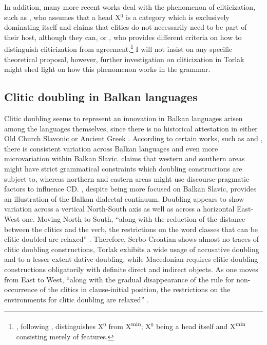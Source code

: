 \documentclass[output=paper,
colorlinks,
citecolor=brown,
newtxmath
]{langscibook}
\begin{document}
In addition, many more recent works deal with the phenomenon of cliticization, such as \citet{Roberts2010}, who assumes that a head X$^0$ is a category which is exclusively dominating itself and claims that clitics do not necessarily need to be part of their host, although they can, or \citet{kramer2014clitic}, who provides different criteria on how to distinguish cliticization from agreement.\footnote{\citet[54]{Roberts2010}, following \citet{Chomsky1995}, distinguishes X$^0$ from X\textsuperscript{min}; X$^0$ being a head itself and X\textsuperscript{min} consisting merely of features.} I will not insist on any specific theoretical proposal, however, further investigation on cliticization in Torlak might shed light on how this phenomenon works in the grammar.

\subsection{Clitic doubling in Balkan languages}
\label{subsec:balkan}
Clitic doubling seems to represent an innovation in Balkan languages arisen among the languages themselves, since there is no historical attestation in either Old Church Slavonic or Ancient Greek \citep[9]{Kallulli.Tasmowski2008}. According to certain works, such as \citet{Lopasov1978} and \citet{Tomic2008a, Tomic2008b}, there is consistent variation across Balkan languages and even more microvariation within Balkan Slavic. \citet{Lopasov1978} claims that western and southern areas might have strict grammatical constraints which doubling constructions are subject to, whereas northern and eastern areas might use discourse-pragmatic factors to influence CD. \citet{Tomic2008a, Tomic2008b}, despite being more focused on Balkan Slavic, provides an illustration of the Balkan dialectal continuum. Doubling appears to show variation across a vertical North-South axis as well as across a horizontal East-West one. Moving North to South, ``along with the reduction of the distance between the clitics and the verb, the restrictions on the word classes that can be clitic doubled are relaxed'' \citep[81]{Tomic2008a}. Therefore, Serbo-Croatian shows almost no traces of clitic doubling constructions, Torlak exhibits a wide usage of accusative doubling and to a lesser extent dative doubling, while Macedonian requires clitic doubling constructions obligatorily with definite direct and indirect objects. As one moves from East to West, ``along with the gradual disappearance of the rule for non-occurrence of the clitics in clause-initial position, the restrictions on the environments for clitic doubling are relaxed'' \citep[81]{Tomic2008a}.
\end{document}
